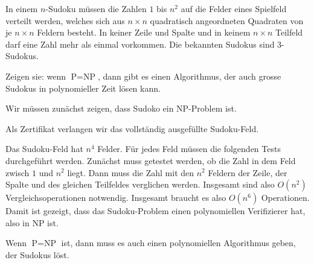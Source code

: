 In einem
$n$-Sudoku müssen die Zahlen $1$ bis $n^2$ auf die Felder eines
Spielfeld verteilt werden, welches sich aus $n\times n$ quadratisch
angeordneten Quadraten von je $n\times n$ Feldern besteht.
In keiner Zeile und Spalte und in keinem $n\times n$ Teilfeld
darf eine Zahl mehr als einmal vorkommen. Die bekannten Sudokus
sind 3-Sudokus.

Zeigen sie: wenn $\text{P}=\text{NP}$, dann gibt es einen Algorithmus,
der auch grosse Sudokus in polynomieller Zeit lösen kann.

\begin{loesung}
Wir müssen zunächst zeigen, dass Sudoko ein NP-Problem ist.

Als Zertifikat verlangen wir das vollständig ausgefüllte Sudoku-Feld.

Das Sudoku-Feld hat $n^4$ Felder. Für jedes Feld müssen die
folgenden Tests durchgeführt werden. Zunächst muss getestet
werden, ob die Zahl in dem Feld zwisch $1$ und $n^2$ liegt.
Dann muss die Zahl mit den $n^2$ Feldern der Zeile, der Spalte
und des gleichen Teilfeldes verglichen werden. Insgesamt sind
also $O(n^2)$ Vergleichsoperationen notwendig.
Insgesamt braucht es also $O(n^6)$ 
Operationen. Damit ist gezeigt, dass das Sudoku-Problem einen polynomiellen
Verifizierer hat, also in NP ist.

Wenn $\text{P}=\text{NP}$ ist, dann muss es auch einen polynomiellen
Algorithmus geben, der Sudokus löst.
\end{loesung}
